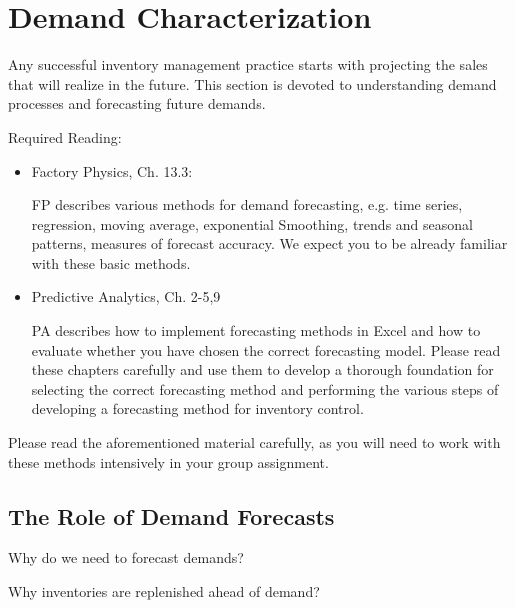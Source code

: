 \section{Demand Characterization}
\label{sec:character}

Any successful inventory management practice starts with projecting the sales that will realize in the future. This section is devoted to understanding demand processes and forecasting future demands. 


Required Reading:
\begin{itemize}
\item Factory Physics, Ch. 13.3: 

FP describes various methods for demand forecasting, e.g. time series, regression, moving average, exponential Smoothing, trends and seasonal patterns, measures of forecast accuracy. We expect you to be already familiar with these basic methods. 
\item Predictive Analytics, Ch. 2-5,9

PA describes how to implement forecasting methods in Excel and how to evaluate whether you have chosen the correct forecasting model. Please read these chapters carefully and use them to develop a thorough foundation for selecting the correct forecasting method and performing the various steps of developing a forecasting method for inventory control.
\end{itemize}
Please read the aforementioned material carefully, as you will need to work with these methods intensively in your group assignment.
 

\subsection{The Role of Demand Forecasts}

\begin{exercise}
Why do we need to forecast demands?

\end{exercise}


\begin{exercise}
Why inventories are replenished ahead of demand?

\end{exercise}

